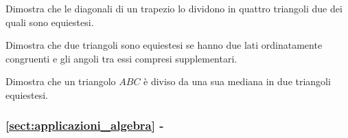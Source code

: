 \begin{multicols}{2}
\begin{esercizio}
\label{ese:7.7}
Dimostra che le diagonali di un trapezio lo dividono in quattro 
triangoli due dei quali sono equiestesi.
\end{esercizio}

\begin{esercizio}
\label{ese:7.8}
Dimostra che due triangoli sono equiestesi se hanno due lati 
ordinatamente congruenti e gli angoli tra essi compresi supplementari.
\end{esercizio}

\begin{esercizio}
\label{ese:7.9}
Dimostra che un triangolo \(ABC\) è diviso da una sua mediana in due 
triangoli equiestesi.
\end{esercizio}

\end{multicols}

\begingroup
\hypersetup{linkcolor=black}
\subsubsection*{\ref{sect:applicazioni_algebra} - 
}
\endgroup

